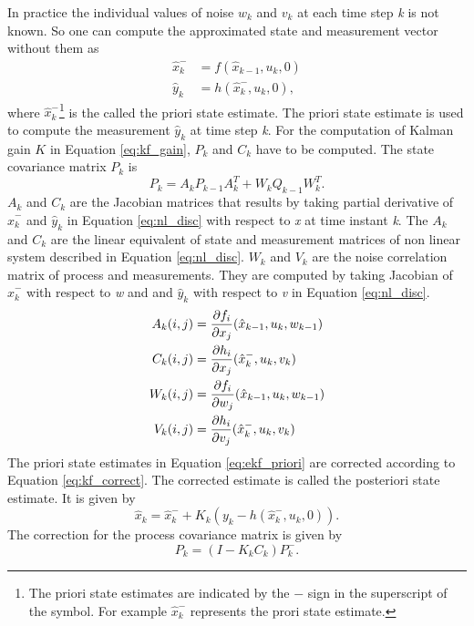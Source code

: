 In practice the individual values of noise $w_k$ and $v_k$ at each time step \emph{k} is not known. So one can compute the approximated state and measurement vector without them as 
\begin{equation}
\begin{split}
\label{eq:ekf_priori}
\hat{x}_k^- &= f(\hat{x}_{k-1},u_{k},0)\\
\hat{y}_k &= h(\hat{x}_k^-,u_{k},0),
\end{split}
\end{equation}
where $\hat{x}_k^-$\footnote{The priori state estimates are indicated by the $-$ sign in the superscript of the symbol. For example $\hat x_k^-$ represents the prori state estimate.} is the called the priori state estimate. The priori state estimate is used to compute the measurement $\hat{y}_k$ at time step \emph{k}. For the computation of Kalman gain $K$ in Equation \ref{eq:kf_gain}, $P_k$ and $C_k$  have to be computed. The state covariance matrix $P_k$ is $$P_k = A_k P_{k-1} A_k^T + W_k Q_{k-1} W_k^T. $$ 
    $A_k$ and $C_k$  are the Jacobian matrices that results by taking partial derivative of $\hat x_k^-$ and $\hat y_k$ in Equation \ref{eq:nl_disc} with respect to \emph{x}  at time instant \emph{k}. The $A_k$ and $C_k$ are the linear equivalent of state and measurement matrices of non linear system described in Equation \ref{eq:nl_disc}. $W_k$ and $V_k$ are the noise correlation matrix of process and measurements. They are computed by taking  Jacobian of $\hat x_k^-$  with respect to \emph{w} and and $\hat y_k$ with respect to \emph{v} in Equation \ref{eq:nl_disc}.
\begin{equation}
\begin{split}
A_k(i,j) &= \frac{\partial {f_i}}{\partial {x_j}}(\hat{x}_{k-1},u_k,w_{k-1})\\
C_k(i,j) &= \frac{\partial {h_i}}{\partial {x_j}}(\hat{x}_k^-,u_k,v_k)\\
W_k(i,j) &= \frac{\partial {f_i}}{\partial {w_j}}(\hat{x}_{k-1},u_k,w_{k-1})\\
V_k(i,j) &= \frac{\partial {h_i}}{\partial {v_j}}(\hat{x}_k^-,u_k,v_k)\\
\end{split}
\end{equation}
The priori state estimates in Equation \ref{eq:ekf_priori} are corrected according to Equation \ref{eq:kf_correct}. The corrected estimate is called the posteriori state estimate. It is given by
\begin{equation}
    \hat{x}_k = \hat{x}_k^- + K_k(y_k-h(\hat{x}_k^-,u_k,0)).
\end{equation}
The correction for the process covariance matrix is given by
\begin{equation}
P_k = (I- K_kC_k)P_k^-.
\end{equation}

